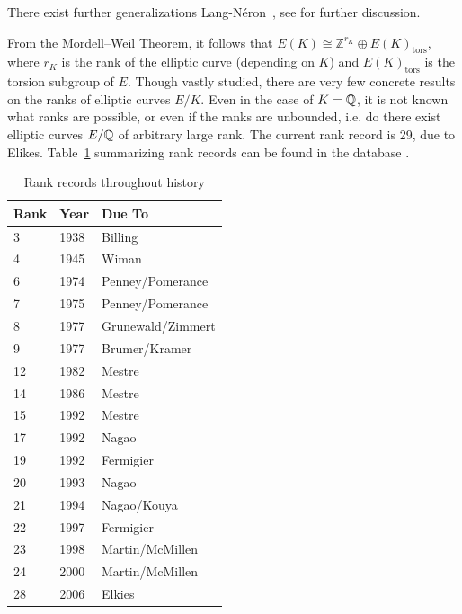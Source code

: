 There exist further generalizations Lang-N\'eron~\cite{lang59}, see \cite{conradb} for further discussion. 


From the Mordell--Weil Theorem, it follows that $E(K) \cong \mathbb{Z}^{r_K} \oplus E(K)_\text{tors}$, where $r_K$ is the rank of the elliptic curve (depending on $K$) and $E(K)_\text{tors}$ is the torsion subgroup of $E$. Though vastly studied, there are very few concrete results on the ranks of elliptic curves $E/K$. Even in the case of $K= \mathbb{Q}$, it is not known what ranks are possible, or even if the ranks are unbounded, i.e. do there exist elliptic curves $E/\mathbb{Q}$ of arbitrary large rank. The current rank record is 29, due to Elikes. Table~\ref{tab:rankbound} summarizing rank records can be found in the database \cite{rankbound}.


	\begin{table}[!ht]
	\centering
	\caption{Rank records throughout history\label{tab:rankbound}}
	\begin{tabular}{lll} \hline
	Rank & Year & Due To \\ \hline
	3 & 1938 & Billing \\ 
	4 & 1945 &  Wiman \\ 
	6 & 1974 & Penney/Pomerance \\ 
	7 & 1975 & Penney/Pomerance \\
	8 & 1977 & Grunewald/Zimmert \\ 
	9 & 1977 & Brumer/Kramer \\
	12 & 1982 & Mestre \\ 
	14 & 1986 & Mestre \\
	15 & 1992 &  Mestre \\  
	17 & 1992 & Nagao \\
	19 & 1992 & Fermigier \\ 
	20 & 1993 & Nagao \\
	21 & 1994 & Nagao/Kouya \\ 
	22 & 1997 & Fermigier \\
	23 & 1998 & Martin/McMillen \\ 
	24 & 2000 & Martin/McMillen \\
	28 & 2006 & Elkies 
	\end{tabular}
	\end{table}


